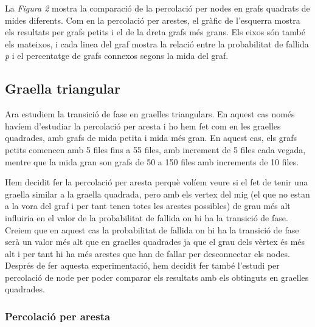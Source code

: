 \documentclass[a4paper]{article}
\begin{document}
	La \textit{Figura 2} mostra la comparació de la percolació per nodes en grafs quadrats de mides diferents. Com en la percolació per arestes, el gràfic de l'esquerra mostra els resultats per grafs petits i el de la dreta grafs més grans. Els eixos són també els mateixos, i cada linea del graf mostra la relació entre la probabilitat de fallida \textit{p} i el percentatge de grafs connexos segons la mida del graf.
	
	\subsection{Graella triangular}
	
	Ara estudiem la transició de fase en graelles triangulars. En aquest cas només havíem d'estudiar la percolació per aresta i ho hem fet com en les graelles quadrades, amb grafs de mida petita i mida més gran. En aquest cas, els grafs petits comencen amb 5 files fins a 55 files, amb increment de 5 files cada vegada, mentre que la mida gran son grafs de 50 a 150 files amb increments de 10 files.
	
	Hem decidit fer la percolació per aresta perquè volíem veure si el fet de tenir una graella similar a la graella quadrada, pero amb els vertex del mig (el que no estan a la vora del graf i per tant tenen totes les arestes possibles) de grau més alt influiria en el valor de la probabilitat de fallida on hi ha la transició de fase. Creiem que en aquest cas la probabilitat de fallida on hi ha la transició de fase serà un valor més alt que en graelles quadrades ja que el grau dels vèrtex és més alt i per tant hi ha més arestes que han de fallar per desconnectar els nodes. Després de fer aquesta experimentació, hem decidit fer també l'estudi per percolació de node per poder comparar els resultats amb els obtinguts en graelles quadrades.
	
	
	\subsubsection{Percolació per aresta}
	
\end{document}

